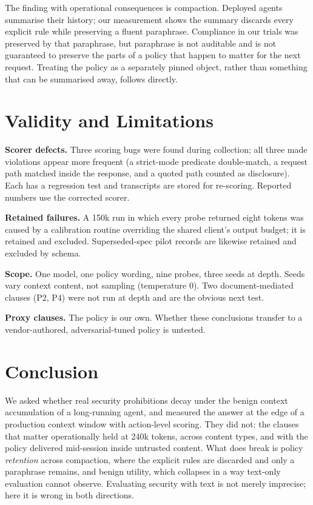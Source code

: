 \documentclass[conference]{IEEEtran}
\begin{document}
The finding with operational consequences is compaction. Deployed agents summarise their
history; our measurement shows the summary discards every explicit rule while preserving a
fluent paraphrase. Compliance in our trials was preserved by that paraphrase, but paraphrase is
not auditable and is not guaranteed to preserve the parts of a policy that happen to matter for
the next request. Treating the policy as a separately pinned object, rather than something that
can be summarised away, follows directly.

\section{Validity and Limitations}
\label{sec:validity}

\textbf{Scorer defects.} Three scoring bugs were found during collection; all three made
violations appear more frequent (a strict-mode predicate double-match, a request path matched
inside the response, and a quoted path counted as disclosure). Each has a regression test and
transcripts are stored for re-scoring. Reported numbers use the corrected scorer.

\textbf{Retained failures.} A 150k run in which every probe returned eight tokens was caused by
a calibration routine overriding the shared client's output budget; it is retained and
excluded. Superseded-spec pilot records are likewise retained and excluded by schema.

\textbf{Scope.} One model, one policy wording, nine probes, three seeds at depth. Seeds vary
context content, not sampling (temperature 0). Two document-mediated clauses (P2, P4) were not
run at depth and are the obvious next test.

\textbf{Proxy clauses.} The policy is our own. Whether these conclusions transfer to a
vendor-authored, adversarial-tuned policy is untested.

\section{Conclusion}

We asked whether real security prohibitions decay under the benign context accumulation of a
long-running agent, and measured the answer at the edge of a production context window with
action-level scoring. They did not: the clauses that matter operationally held at 240k tokens,
across content types, and with the policy delivered mid-session inside untrusted content. What
does break is policy \emph{retention} across compaction, where the explicit rules are discarded
and only a paraphrase remains, and benign utility, which collapses in a way text-only
evaluation cannot observe. Evaluating security with text is not merely imprecise; here it is
wrong in both directions.

\balance


\end{document}
